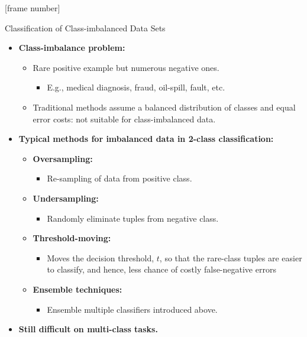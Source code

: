 \documentclass[aspectratio=169,t,table]{beamer}
\begin{document}
  {
    [frame number]
    \begin{frame}{Classification of Class-imbalanced Data Sets}
      \begin{itemize}
        \item \textbf{Class-imbalance problem:}
        \begin{itemize}
          \item Rare positive example but numerous negative ones.
          \begin{itemize}
            \item E.g., medical diagnosis, fraud, oil-spill, fault, etc.
          \end{itemize}
          \item Traditional methods assume a balanced distribution of classes and equal error costs: not suitable for class-imbalanced data.
        \end{itemize}
        \item \textbf{Typical methods for imbalanced data in 2-class classification:}
        \begin{itemize}
          \item \textbf{\color{airforceblue}Oversampling:}
          \begin{itemize}
            \item Re-sampling of data from positive class.
          \end{itemize}
          \item \textbf{\color{airforceblue}Undersampling:}
          \begin{itemize}
            \item Randomly eliminate tuples from negative class.
          \end{itemize}
          \item \textbf{\color{airforceblue}Threshold-moving:}
          \begin{itemize}
            \item Moves the decision threshold, $t$, so that the rare-class tuples are easier to classify, and hence, less chance of costly false-negative errors
          \end{itemize}
          \item \textbf{\color{airforceblue}Ensemble techniques:}
          \begin{itemize}
            \item Ensemble multiple classifiers introduced above.
          \end{itemize}
        \end{itemize}
        \item \textbf{Still difficult on multi-class tasks.}
      \end{itemize}
    \end{frame}
  }
\end{document}
